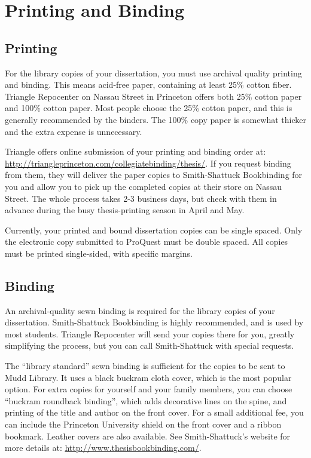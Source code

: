 \chapter{Printing and Binding\label{ch:printing}}

\section{Printing}

For the library copies of your dissertation, you must use archival quality printing and binding. This means acid-free paper, containing at least 25\% cotton fiber. Triangle Repocenter on Nassau Street in Princeton offers both 25\% cotton paper and 100\% cotton paper. Most people choose the 25\% cotton paper, and this is generally recommended by the binders. The 100\% copy paper is somewhat thicker and the extra expense is unnecessary. 

Triangle offers online submission of your printing and binding order at: \url{http://triangleprinceton.com/collegiatebinding/thesis/}. If you request binding from them, they will deliver the paper copies to Smith-Shattuck Bookbinding for you and allow you to pick up the completed copies at their store on Nassau Street. The whole process takes 2-3 business days, but check with them in advance during the busy thesis-printing season in April and May. 

Currently, your printed and bound dissertation copies can be single spaced. Only the electronic copy submitted to ProQuest must be double spaced. All copies must be printed single-sided, with specific margins. 

\section{Binding}

An archival-quality sewn binding is required for the library copies of your dissertation. Smith-Shattuck Bookbinding is highly recommended, and is used by most students. Triangle Repocenter will send your copies there for you, greatly simplifying the process, but you can call Smith-Shattuck with special requests. 

The ``library standard'' sewn binding is sufficient for the copies to be sent to Mudd Library. It uses a black buckram cloth cover, which is the most popular option. For extra copies for yourself and your family members, you can choose ``buckram roundback binding'', which adds decorative lines on the spine, and printing of the title and author on the front cover. For a small additional fee, you can include the Princeton University shield on the front cover and a ribbon bookmark. Leather covers are also available. See Smith-Shattuck's website for more details at: \url{http://www.thesisbookbinding.com/}. 